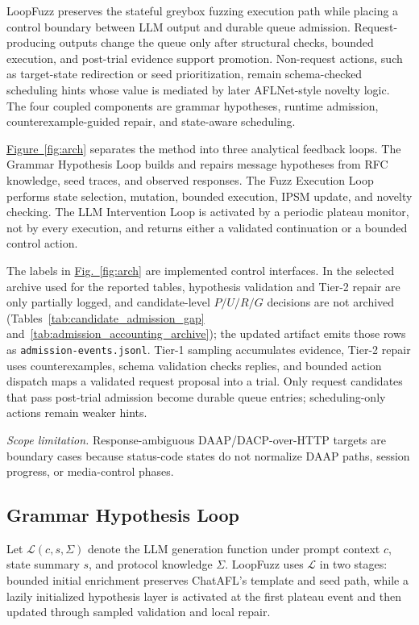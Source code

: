 \documentclass[final,5p,times,number]{elsarticle}
\newcommand{\figref}[1]{\hyperref[#1]{Fig.~\ref*{#1}}}
\newcommand{\figureref}[1]{\hyperref[#1]{Figure~\ref*{#1}}}
\begin{document}
LoopFuzz preserves the stateful greybox fuzzing execution path while placing a control boundary between LLM output and durable queue admission. Request-producing outputs change the queue only after structural checks, bounded execution, and post-trial evidence support promotion. Non-request actions, such as target-state redirection or seed prioritization, remain schema-checked scheduling hints whose value is mediated by later AFLNet-style novelty logic. The four coupled components are grammar hypotheses, runtime admission, counterexample-guided repair, and state-aware scheduling.

\figureref{fig:arch} separates the method into three analytical feedback loops. The Grammar Hypothesis Loop builds and repairs message hypotheses from RFC knowledge, seed traces, and observed responses. The Fuzz Execution Loop performs state selection, mutation, bounded execution, IPSM update, and novelty checking. The LLM Intervention Loop is activated by a periodic plateau monitor, not by every execution, and returns either a validated continuation or a bounded control action.

The labels in \figref{fig:arch} are implemented control interfaces. In the selected archive used for the reported tables, hypothesis validation and Tier-2 repair are only partially logged, and candidate-level $P/U/R/G$ decisions are not archived (Tables~\ref{tab:candidate_admission_gap} and~\ref{tab:admission_accounting_archive}); the updated artifact emits those rows as \texttt{admission-events.jsonl}. Tier-1 sampling accumulates evidence, Tier-2 repair uses counterexamples, schema validation checks replies, and bounded action dispatch maps a validated request proposal into a trial. Only request candidates that pass post-trial admission become durable queue entries; scheduling-only actions remain weaker hints.

\emph{Scope limitation.} Response-ambiguous DAAP/DACP-over-HTTP targets are boundary cases because status-code states do not normalize DAAP paths, session progress, or media-control phases.

\subsection{Grammar Hypothesis Loop}
Let $\mathcal{L}(c, s, \Sigma)$ denote the LLM generation function under prompt context $c$, state summary $s$, and protocol knowledge $\Sigma$. LoopFuzz uses $\mathcal{L}$ in two stages: bounded initial enrichment preserves ChatAFL's template and seed path, while a lazily initialized hypothesis layer is activated at the first plateau event and then updated through sampled validation and local repair.
\end{document}

